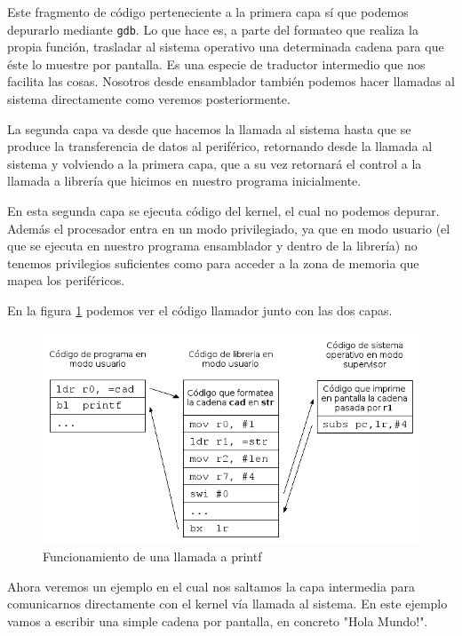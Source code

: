 Este fragmento de código perteneciente a la primera capa sí que podemos
depurarlo mediante {\tt gdb}. Lo que hace es, a parte del formateo que
realiza la propia función, trasladar al sistema operativo una determinada
cadena para que éste lo muestre por pantalla. Es una especie de traductor
intermedio que nos facilita las cosas. Nosotros desde ensamblador también
podemos hacer llamadas al sistema directamente como veremos posteriormente.

La segunda capa va desde que hacemos la llamada al sistema hasta que se
produce la transferencia de datos al periférico, retornando desde la llamada
al sistema y volviendo a la primera capa, que a su vez retornará el control
a la llamada a librería que hicimos en nuestro programa inicialmente.

En esta segunda capa se ejecuta código del kernel, el cual no podemos depurar.
Además el procesador entra en un modo privilegiado, ya que en modo usuario (el
que se ejecuta en nuestro programa ensamblador y dentro de la librería) no
tenemos privilegios suficientes como para acceder a la zona de memoria que
mapea los periféricos.

En la figura \ref{fig:capas} podemos ver el código llamador junto con las dos
capas.

\begin{figure}[h]
  \centering
    \includegraphics[width=14cm]{graphs/capas.png}
  \caption{Funcionamiento de una llamada a printf}
  \label{fig:capas}
\end{figure}

Ahora veremos un ejemplo en el cual nos saltamos la capa intermedia para
comunicarnos directamente con el kernel vía llamada al sistema. En este ejemplo
vamos a escribir una simple cadena por pantalla, en concreto "Hola Mundo!".

